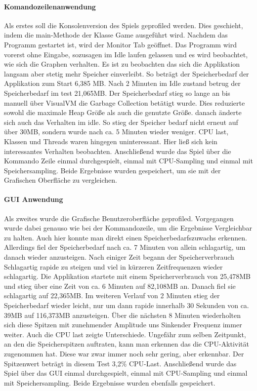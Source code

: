 \documentclass{article}
\begin{document}
\paragraph{Komandozeilenanwendung}
Als erstes soll die Konsolenversion des Spiels geprofiled werden. Dies geschieht, indem die main-Methode der Klasse Game ausgeführt wird. Nachdem das Programm gestartet ist, wird der Monitor Tab geöffnet. Das Programm wird vorerst ohne Eingabe, sozusagen im Idle laufen gelassen und es wird beobachtet, wie sich die Graphen verhalten. Es ist zu beobachten das sich die Applikation langsam aber stetig mehr Speicher einverleibt. So beträgt der Speicherbedarf der Applikation zum Start 6,385 MB. Nach 2 Minuten im Idle zustand betrug der Speicherbedarf im test 21,065MB. Der Speicherbedarf stieg so lange an bis manuell über VisualVM die Garbage Collection betätigt wurde. Dies reduzierte sowohl die maximale Heap Größe als auch die genutzte Größe. danach änderte sich auch das Verhalten im idle. So stieg der Speicher bedarf nicht erneut auf über 30MB, sondern wurde nach ca. 5 Minuten wieder weniger. CPU last, Klassen und Threads waren hingegen uninteressant. Hier ließ sich kein interessantes Verhalten beobachten.
Anschließend wurde das Spiel über die Kommando Zeile einmal durchgespielt, einmal mit CPU-Sampling und einmal mit Speichersampling. Beide Ergebnisse wurden gespeichert, um sie mit der Grafischen Oberfläche zu vergleichen.

\paragraph{GUI Anwendung}
Als zweites wurde die Grafische Benutzeroberfläche geprofiled. Vorgegangen wurde dabei genauso wie bei der Kommandozeile, um die Ergebnisse Vergleichbar zu halten. Auch hier konnte man direkt einen Speicherbedarfszuwachs erkennen. Allerdings fiel der Speicherbedarf nach ca. 7 Minuten von allein schlagartig, um danach wieder anzusteigen. Nach einiger Zeit begann der Speicherverbrauch Schlagartig rapide zu steigen und viel in kürzeren Zeitfrequenzen wieder schlagartig. Die Applikation startete mit einem Speicherverbrauch von 25,478MB und stieg über eine Zeit von ca. 6 Minuten auf 82,108MB an. Danach fiel sie schlagartig auf 22,365MB. Im weiteren Verlauf von 2 Minuten stieg der Speicherbedarf wieder leicht, nur um dann rapide innerhalb 30 Sekunden von ca. 39MB auf 116,373MB anzusteigen. Über die nächsten 8 Minuten wiederholten sich diese Spitzen mit zunehmender Amplitude uns Sinkender Frequenz immer weiter. Auch die CPU last zeigte Unterschiede. Ungefähr zum selben Zeitpunkt, an den die Speicherspitzen auftraten, kann man erkennen das die CPU-Aktivität zugenommen hat. Diese war zwar immer noch sehr gering, aber erkennbar. Der Spitzenwert beträgt in diesem Test 3,2\% CPU-Last. Anschließend wurde das Spiel über das GUI einmal durchgespielt, einmal mit CPU-Sampling und einmal mit Speichersampling. Beide Ergebnisse wurden ebenfalls gespeichert.
\end{document}
